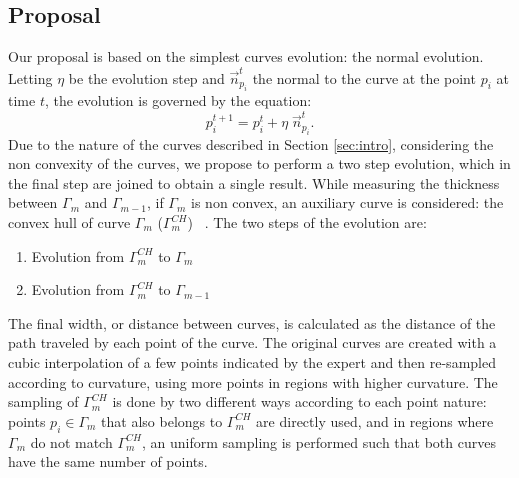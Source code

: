 \documentclass{article}
\begin{document}
\subsection{Proposal}
\label{ssec:proposal}
Our proposal is based on the simplest curves evolution: the normal evolution. Letting $\eta$ be the evolution step and $\vec{n}_{p_i}^t$ the normal to the curve at the point $p_i$ at time $t$, the evolution is governed by the equation:
\begin{equation}
  p_i^{t+1}=p_i^t+\eta \; \vec{n}_{p_i}^t.
  \label{ec:normal}
\end{equation}
Due to the nature of the curves described in Section \ref{sec:intro}, considering the non convexity of the curves, we propose to perform a two step evolution, which in the final step are joined to obtain a single result. While measuring the thickness between $\Gamma_m$ and $\Gamma_{m-1}$, if $\Gamma_m$ is non convex, an auxiliary curve is considered: the convex hull of curve $\Gamma_m$ ($\Gamma_m^{CH}$) ~\cite{libro}. The two steps of the evolution are:
\begin{enumerate}
  \item Evolution from $\Gamma_m^{CH}$ to $\Gamma_m$
  \item Evolution from $\Gamma_m^{CH}$ to $\Gamma_{m-1}$
\end{enumerate}
The final width, or distance between curves, is calculated as the distance of the path traveled by each point of the curve. The original curves are created with a cubic interpolation of a few points indicated by the expert and then re-sampled according to curvature, using more points in regions with higher curvature. The sampling of $\Gamma_m^{CH}$ is done by two different ways according to each point nature: points $p_i\in\Gamma_{m}$ that also belongs to $\Gamma_m^{CH}$ are directly used, and in regions where $\Gamma_m$ do not match $\Gamma_m^{CH}$, an uniform sampling is performed such that both curves have the same number of points.
\end{document}
